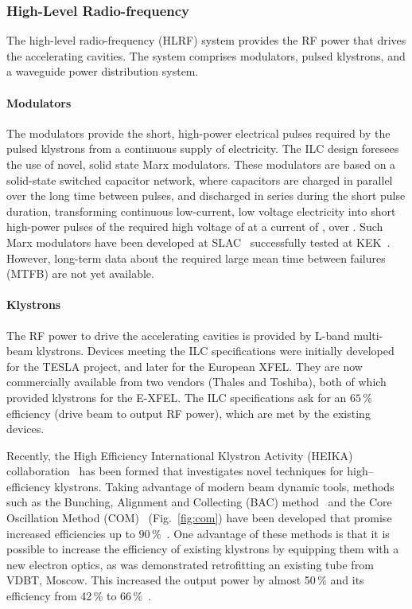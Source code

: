 \subsubsection{High-Level Radio-frequency}

The high-level radio-frequency (HLRF) system provides the RF power that drives the accelerating cavities.
The system comprises modulators, pulsed klystrons, and a waveguide power distribution system.


\paragraph{Modulators}
The modulators provide the short, high-power electrical pulses required by the pulsed klystrons from a continuous supply of electricity. 
The ILC design foresees the use of novel, solid state Marx modulators.
These modulators are based on a solid-state switched capacitor network, where capacitors are charged in parallel over the long time between pulses, and discharged in series during the short pulse duration,
transforming continuous low-current, low voltage electricity into short high-power pulses of the required high voltage of  at a current of , over .
Such Marx modulators have been developed at SLAC~\cite{Kemp:2011zz} successfully tested at KEK~\cite{Gaudreau:2014pza}.
However, long-term data about the required large mean time between failures (MTFB) are not yet available.

\paragraph{Klystrons}
The RF power to drive the accelerating cavities is provided by  L-band multi-beam klystrons. 
Devices meeting the ILC specifications were initially developed for the TESLA project, and later for the European XFEL.
They are now commercially available from two vendors (Thales and Toshiba), both of which provided klystrons for the E-XFEL.
The ILC specifications ask for an $65\,\%$ efficiency (drive beam to output RF power), which are met by the existing devices.

Recently, the High Efficiency International Klystron Activity (HEIKA) collaboration~\cite{Syratchev:2015a, Gerigk:2018ebm} has been formed that investigates novel techniques for high--efficiency klystrons.
Taking advantage of modern beam dynamic tools, methods such as the Bunching, Alignment and Collecting (BAC) method~\cite{Guzilov:2014a} and the Core Oscillation Method (COM)~\cite{Constable:2017hha} (Fig.~\ref{fig:com})
 have been developed that promise increased efficiencies up to $90\,\%$~\cite{Baikov:2015bif}.  
One advantage of these methods is that it is possible to increase the efficiency of existing klystrons by equipping them with a new electron optics, as was demonstrated retrofitting an existing tube from VDBT, Moscow. 
This increased the output power by almost 50\,\% and its efficiency from 42\,\% to 66\,\%~\cite{Jensen:2016a}.

